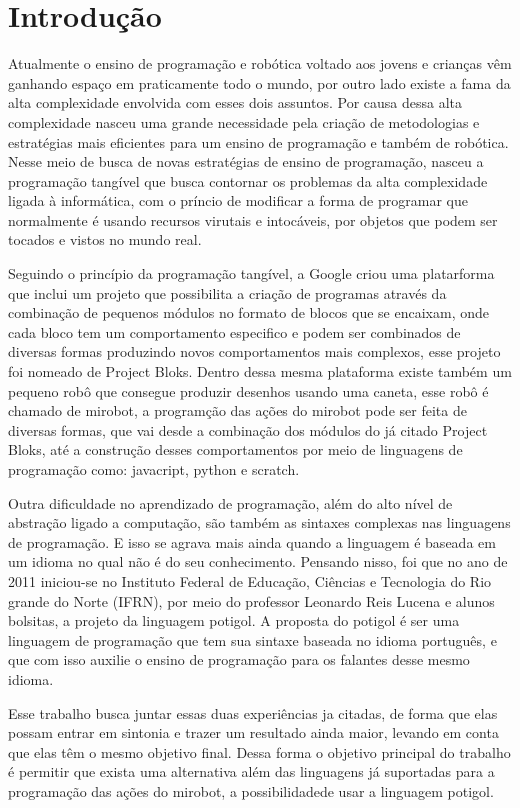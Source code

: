 \chapter{Introdução}\label{cap:introducao}

Atualmente o ensino de programação e robótica voltado aos jovens e crianças vêm
ganhando espaço em praticamente todo o mundo, por outro lado existe a fama da
alta complexidade envolvida com esses dois assuntos. Por causa dessa alta
complexidade nasceu uma grande necessidade pela criação de metodologias e
estratégias mais eficientes para um ensino de programação e também de robótica.
Nesse meio de busca de novas estratégias de ensino de programação, nasceu a
programação tangível que busca contornar os problemas da alta complexidade
ligada à informática, com o príncio de modificar a forma de programar que
normalmente é usando recursos virutais e intocáveis, por objetos que podem ser
tocados e vistos no mundo real.

Seguindo o princípio da programação tangível, a Google criou uma platarforma
que inclui um projeto que possibilita a criação de programas através da
combinação de pequenos módulos no formato de blocos que se encaixam, onde cada
bloco tem um comportamento especifico e podem ser combinados de diversas formas
produzindo novos comportamentos mais complexos, esse projeto foi nomeado de
Project Bloks. Dentro dessa mesma plataforma existe também um pequeno robô que
consegue produzir desenhos usando uma caneta, esse robô é chamado de mirobot, a
programção das ações do mirobot pode ser feita de diversas formas, que vai
desde a combinação dos módulos do já citado Project Bloks, até a construção
desses comportamentos por meio de linguagens de programação como: javacript,
python e scratch.

Outra dificuldade no aprendizado de programação, além do alto nível de
abstração ligado a computação, são também as sintaxes complexas nas linguagens
de programação. E isso se agrava mais ainda quando a linguagem é baseada em um
idioma no qual não é do seu conhecimento. Pensando nisso, foi que no ano de
2011 iniciou-se no Instituto Federal de Educação, Ciências e Tecnologia do Rio
grande do Norte (IFRN), por meio do professor Leonardo Reis Lucena e alunos
bolsitas, a projeto da linguagem potigol. A proposta do potigol é ser uma
linguagem de programação que tem sua sintaxe baseada no idioma português, e que
com isso auxilie o ensino de programação para os falantes desse mesmo idioma.

Esse trabalho busca juntar essas duas experiências ja citadas, de forma que
elas possam entrar em sintonia e trazer um resultado ainda maior, levando em
conta que elas têm o mesmo objetivo final. Dessa forma o objetivo principal do
trabalho é permitir que exista uma alternativa além das linguagens já
suportadas para a programação das ações do mirobot, a possibilidadede usar a
linguagem potigol.

